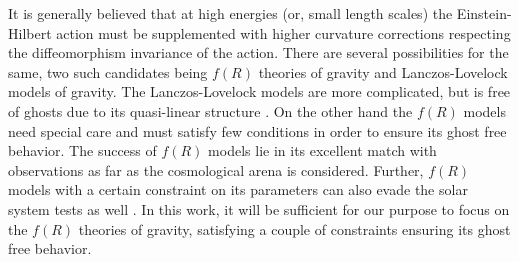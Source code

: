 \documentclass{article}
\def\EH{Einstein-Hilbert }
\begin{document}
It is generally believed that at high energies (or, small length scales) the \EH action must be supplemented with higher curvature corrections respecting the diffeomorphism invariance of the action. There are several possibilities for the same, two such candidates being $f(R)$ theories of gravity and Lanczos-Lovelock models of gravity. The Lanczos-Lovelock models are more complicated, but is free of ghosts due to its quasi-linear structure \cite{Chakraborty:2015kva,Chakraborty:2015wma,Chakraborty:2014joa,Chakraborty:2014rga,Dadhich:2008df,Padmanabhan:2013xyr}. On the other hand the $f(R)$ models need special care and must satisfy few conditions in order to ensure its ghost free behavior. The success of $f(R)$ models lie in its excellent match with observations as far as the cosmological arena is considered. Further, $f(R)$ models with a certain constraint on its parameters can also evade the solar system tests as well \cite{Pogosian:2007sw,
Capozziello:2005bu,Capozziello:2007ms,Sotiriou:2005xe,Capozziello:2006jj,Nojiri:2001ae,Nojiri:2010wj,
Sotiriou:2008rp,DeFelice:2010aj,Chakraborty:2014xla,Chakraborty:2015bja,Chakraborty:2015taq,Nojiri:2003ft,Nojiri:2007as,Hu:2007nk}. In this work, it will be sufficient for our purpose to focus on the $f(R)$ theories of gravity, satisfying a couple of constraints ensuring its ghost free behavior. 
\end{document}
